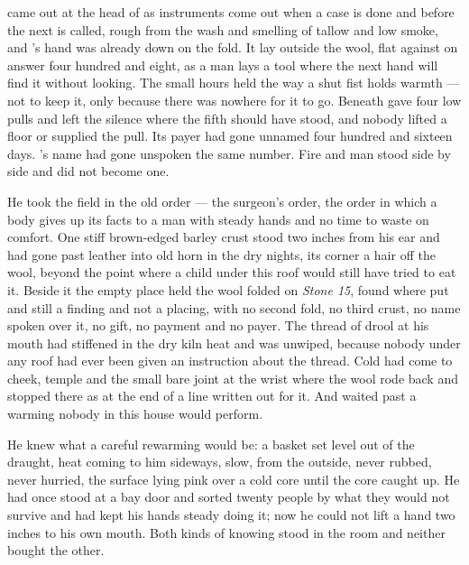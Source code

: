
 came out at the head of  as instruments come out when a case is done and before the next is called, rough from the wash and smelling of tallow and low smoke, and 's hand was already down on the fold. It lay outside the wool, flat against  on answer four hundred and eight, as a man lays a tool where the next hand will find it without looking. The small hours held  the way a shut fist holds warmth --- not to keep it, only because there was nowhere for it to go. Beneath   gave four low pulls and left the silence where the fifth should have stood, and nobody lifted a floor or supplied the pull. Its payer had gone unnamed four hundred and sixteen days. 's name had gone unspoken the same number. Fire and man stood side by side and did not become one.

He took the field in the old order --- the surgeon's order, the order in which a body gives up its facts to a man with steady hands and no time to waste on comfort. One stiff brown-edged barley crust stood two inches from his ear and had gone past leather into old horn in the dry nights, its corner a hair off the wool, beyond the point where a child under this roof would still have tried to eat it. Beside it the empty place held the wool folded on \emph{Stone 15}, found where put and still a finding and not a placing, with no second fold, no third crust, no name spoken over it, no gift, no payment and no payer. The thread of drool at his mouth had stiffened in the dry kiln heat and was unwiped, because nobody under any roof had ever been given an instruction about the thread. Cold had come to cheek, temple and the small bare joint at the wrist where the wool rode back and stopped there as at the end of a line written out for it. And  waited past a warming nobody in this house would perform.

He knew what a careful rewarming would be: a basket set level out of the draught, heat coming to him sideways, slow, from the outside, never rubbed, never hurried, the surface lying pink over a cold core until the core caught up. He had once stood at a bay door and sorted twenty people by what they would not survive and had kept his hands steady doing it; now he could not lift a hand two inches to his own mouth. Both kinds of knowing stood in the room and neither bought the other.

